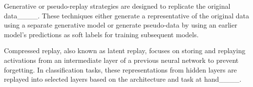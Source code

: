 Generative or pseudo-replay strategies are designed to replicate the original data____. These techniques either generate a representative of the original data using a separate generative model or generate pseudo-data by using an earlier model's predictions as soft labels for training subsequent models. 




Compressed replay, also known as latent replay, focuses on storing and replaying activations from an intermediate layer of a previous neural network to prevent forgetting. In classification tasks, these representations from hidden layers are replayed into selected layers based on the architecture and task at hand____. 


